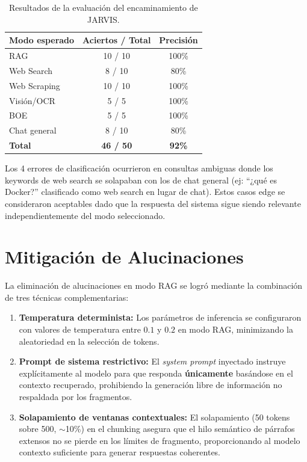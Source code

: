 \begin{table}[H]
\centering
\caption{Resultados de la evaluación del encaminamiento de JARVIS.}
\label{tab:enrutamiento-eval}
\begin{tabular}{lcc}
\toprule
\textbf{Modo esperado} & \textbf{Aciertos / Total} & \textbf{Precisión} \\
\midrule
RAG           & 10 / 10 & 100\% \\
Web Search    & 8 / 10  & 80\% \\
Web Scraping  & 10 / 10 & 100\% \\
Visión/OCR    & 5 / 5   & 100\% \\
BOE           & 5 / 5   & 100\% \\
Chat general  & 8 / 10  & 80\% \\
\midrule
\textbf{Total} & \textbf{46 / 50} & \textbf{92\%} \\
\bottomrule
\end{tabular}
\end{table}

Los 4 errores de clasificación ocurrieron en consultas ambiguas donde los keywords de web search se solapaban con los de chat general (ej: ``¿qué es Docker?'' clasificado como web search en lugar de chat). Estos casos edge se consideraron aceptables dado que la respuesta del sistema sigue siendo relevante independientemente del modo seleccionado.

\section{Mitigación de Alucinaciones}

La eliminación de alucinaciones en modo RAG se logró mediante la combinación de tres técnicas complementarias:

\begin{enumerate}
    \item \textbf{Temperatura determinista:} Los parámetros de inferencia se configuraron con valores de temperatura entre $0.1$ y $0.2$ en modo RAG, minimizando la aleatoriedad en la selección de tokens.

    \item \textbf{Prompt de sistema restrictivo:} El \textit{system prompt} inyectado instruye explícitamente al modelo para que responda \textbf{únicamente} basándose en el contexto recuperado, prohibiendo la generación libre de información no respaldada por los fragmentos.

    \item \textbf{Solapamiento de ventanas contextuales:} El solapamiento (50 tokens sobre 500, $\sim$10\%) en el chunking asegura que el hilo semántico de párrafos extensos no se pierde en los límites de fragmento, proporcionando al modelo contexto suficiente para generar respuestas coherentes.
\end{enumerate}


